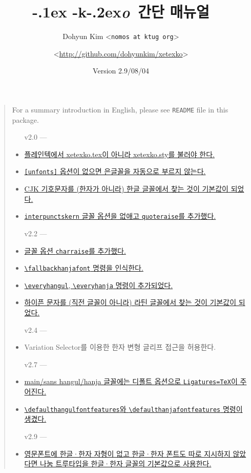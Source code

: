 \documentclass[a4paper]{article}
\def\logoko{\textsf{k}\kern-.2ex\textit{o}}
\def\XeTeX{\hologo{XeTeX}}
\def\xetexko{\XeTeX\kern-.1ex -\logoko}
\def\cs#1{\texttt{\textbackslash #1}}
\def\hparen#1{{\small\hangulparens(#1)}}
\begin{document}
\title{\xetexko\ 간단 매뉴얼}
\author{Dohyun Kim \normalsize <\texttt{nomos at ktug org}> \and
  \normalsize <\url{http://github.com/dohyunkim/xetexko}>}
\date{Version 2.9/08/04}
\maketitle

\begin{quote}\small
  For a summary introduction in English,
  please see \verb+README+ file in this package.

  \begin{itemize}\itemsep=0pt\linespread{1.3}\selectfont
    \item[v2.0]---
    \item \hyperref[sec:loading]
      {플레인텍에서 xetexko.tex이 아니라 xetexko.sty를 불러야 한다.}
    \item \hyperref[sec:loading]
      {\texttt{[unfonts]} 옵션이 없으면 은글꼴을 자동으로 부르지 않는다.}
    \item \hyperref[sec:symbolfont]
      {CJK 기호문자를 \hparen{한자가 아니라} 한글 글꼴에서 찾는 것이
      기본값이 되었다.}
    \item \hyperref[sec:fontopts]
      {\texttt{interpunctskern} 글꼴 옵션을 없애고 \texttt{quoteraise}를
      추가했다.}
    \item[v2.2]---
    \item \hyperref[sec:fontopts]
      {글꼴 옵션 \texttt{charraise}를 추가했다.}
    \item \hyperref[sec:fontcmds]
      {\cs{fallbackhanjafont} 명령을 인식한다.}
    \item \hyperref[sec:etccmds]
      {\cs{everyhangul}, \cs{everyhanja} 명령이 추가되었다.}
    \item \hyperref[sec:symbolfont]
      {하이픈 문자를 \hparen{직전 글꼴이 아니라} 라틴 글꼴에서 찾는
      것이 기본값이 되었다.}
    \item[v2.4]---
    \item Variation Selector를 이용한 한자 변형 글리프 접근을 허용한다.
    \item[v2.7]---
    \item \hyperref[sec:fontcmds]
      {main/sans hangul/hanja 글꼴에는 디폴트 옵션으로
      \texttt{Ligatures=TeX}이 주어진다.}
    \item \hyperref[sec:fontopts]
      {\cs{defaulthangulfontfeatures}와 \cs{defaulthanjafontfeatures}
      명령이 생겼다.}
    \item[v2.9]---
    \item \hyperref[sec:fontcmds]
      {영문폰트에 한글·한자 자형이 없고 한글·한자 폰트도 따로 지시하지 않았다면
      나눔 트루타입을 한글·한자 글꼴의 기본값으로 사용한다.}
  \end{itemize}
\end{quote}
\end{document}
